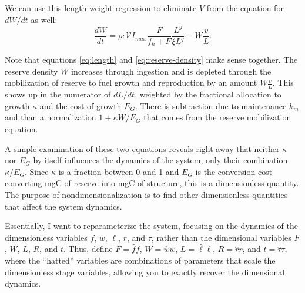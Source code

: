 \documentclass[12pt,reqno,final,pdftex]{amsart}\usepackage[]{graphicx}\usepackage[]{color}
\theoremstyle{plain}
\numberwithin{equation}{part}
\begin{document}
We can use this length-weight regression to eliminate $V$ from the equation for $dW/dt$ as well:
\begin{equation}\label{eq:reserve-density}
\frac{dW}{dt} = \rho \epsilon \mathcal{V} I_{max} \frac{F}{f_h+F} \frac{L^g}{\xi L^{q}} - W \frac{v}{L}.
\end{equation}

Note that equations \ref{eq:length} and \ref{eq:reserve-density} make sense together.
The reserve density $W$ increases through ingestion and is depleted through the mobilization of reserve to fuel growth and reproduction by an amount $W \frac{v}{L}$.
This shows up in the numerator of $dL/dt$, weighted by the fractional allocation to growth $\kappa$ and the cost of growth $E_G$.
There is subtraction due to maintenance $k_m$ and than a normalization $1 + \kappa W/E_G$ that comes from the reserve mobilization equation.

A simple examination of these two equations reveals right away that neither $\kappa$ nor $E_G$ by itself influences the dynamics of the system, only their combination $\kappa/E_G$.
Since $\kappa$ is a fraction between 0 and 1 and $E_G$ is the conversion cost converting mgC of reserve into mgC of structure, this is a dimensionless quantity.
The purpose of nondimensionalization is to find other dimensionless quantities that affect the system dynamics.

Essentially, I want to reparameterize the system, focusing on the dynamics of the dimensionless variables $f$, $w$, $\ell$, $r$, and $\tau$, rather than the dimensional variables $F$, $W$, $L$, $R$, and $t$.
Thus, define $F = \hat{f} f$, $W = \hat{w} w$, $L = \hat{\ell} \ell$, $R = \hat{r} r$, and $t = \hat{\tau} \tau$, where the ``hatted'' variables are combinations of parameters that scale the dimensionless stage variables, allowing you to exactly recover the dimensional dynamics.
\end{document}
